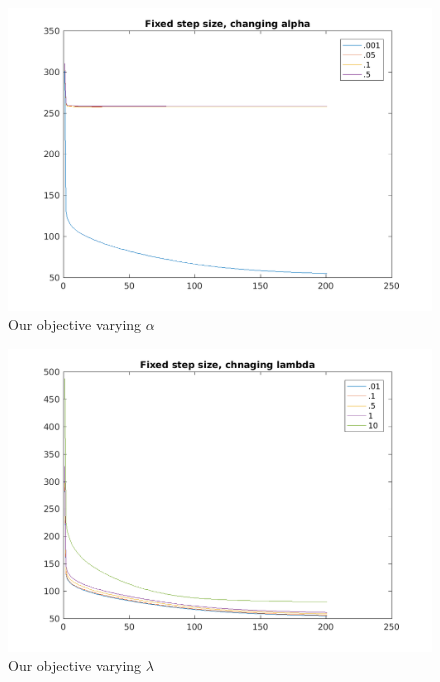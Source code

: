 \documentclass{article}
\newcommand{\0}{\mathrm{0}}
\newcommand{\1}{\mathrm{1}}
\begin{document}
\begin{figure}
  \includegraphics[width=\textwidth]{fixed-step-alpha.png}
  \caption{Our objective varying $\alpha$}
\end{figure}

\begin{figure}
  \includegraphics[width=\textwidth]{fixed-step-lambda.png}
  \caption{Our objective varying $\lambda$}
\end{figure}
\end{document}
